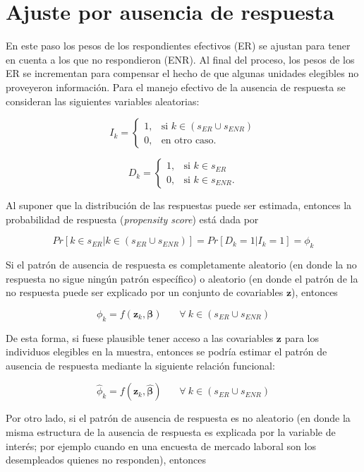 \documentclass[
  12pt,
  spanish,
]{book}
\begin{document}
\hypertarget{ajuste-por-ausencia-de-respuesta}{%
\section{Ajuste por ausencia de respuesta}\label{ajuste-por-ausencia-de-respuesta}}

En este paso los pesos de los respondientes efectivos (ER) se ajustan para tener en cuenta a los que no respondieron (ENR). Al final del proceso, los pesos de los ER se incrementan para compensar el hecho de que algunas unidades elegibles no proveyeron información. Para el manejo efectivo de la ausencia de respuesta se consideran las siguientes variables aleatorias:

\[
I_k=
\begin{cases}
1,  &\text{si $k \in (s_{ER} \cup s_{ENR})$}\\
0,  &\text{en otro caso.}
\end{cases}
\]

\[
D_k=
\begin{cases}
1,  &\text{si $k \in s_{ER}$}\\
0,  &\text{si $k \in s_{ENR}$.}
\end{cases}
\]

Al suponer que la distribución de las respuestas puede ser estimada, entonces la probabilidad de respuesta (\emph{propensity score}) está dada por

\[
Pr[ k\in s_{ER}|k\in (s_{ER} \cup s_{ENR})]=Pr[D_k = 1|I_k = 1]=\phi_k
\]

Si el patrón de ausencia de respuesta es completamente aleatorio (en donde la no respuesta no sigue ningún patrón específico) o aleatorio (en donde el patrón de la no respuesta puede ser explicado por un conjunto de covariables \(\mathbf{z}\)), entonces

\[
\phi_k = f(\mathbf{z}_k, \boldsymbol{\beta})   \ \ \ \ \ \ \ \ \forall \ k \in (s_{ER} \cup s_{ENR})
\]

De esta forma, si fuese plausible tener acceso a las covariables \(\mathbf{z}\) para los individuos elegibles en la muestra, entonces se podría estimar el patrón de ausencia de respuesta mediante la siguiente relación funcional:

\[
\hat{\phi}_k = f(\mathbf{z}_k, \hat{\boldsymbol{\beta}})   \ \ \ \ \ \ \ \ \forall \ k \in (s_{ER} \cup s_{ENR})
\]

Por otro lado, si el patrón de ausencia de respuesta es no aleatorio (en donde la misma estructura de la ausencia de respuesta es explicada por la variable de interés; por ejemplo cuando en una encuesta de mercado laboral son los desempleados quienes no responden), entonces
\end{document}
